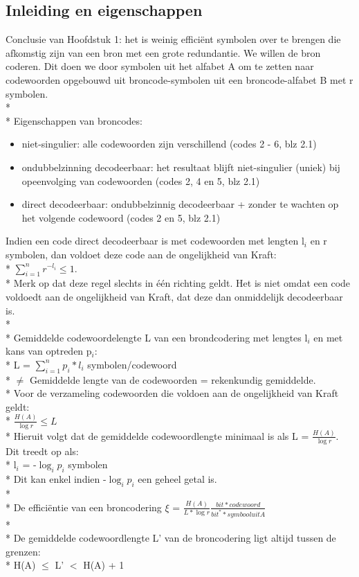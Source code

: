 \documentclass[10pt]{article}
\begin{document}
\subsection{Inleiding en eigenschappen}
Conclusie van Hoofdstuk 1: het is weinig effici\"ent symbolen over te brengen die afkomstig zijn van een bron met een grote redundantie. We willen de bron coderen. Dit doen we door symbolen uit het alfabet A om te zetten naar codewoorden opgebouwd uit broncode-symbolen uit een broncode-alfabet B met r symbolen.\\*\\*
Eigenschappen van broncodes:
\begin{itemize}
\item niet-singulier: alle codewoorden zijn verschillend {\scriptsize (codes 2 - 6, blz 2.1)}
\item ondubbelzinning decodeerbaar: het resultaat blijft niet-singulier (uniek) bij opeenvolging van codewoorden {\scriptsize (codes 2, 4 en 5, blz 2.1)}
\item direct decodeerbaar: ondubbelzinnig decodeerbaar + zonder te wachten op het volgende codewoord {\scriptsize (codes 2 en 5, blz 2.1)}
\end{itemize}
Indien een code direct decodeerbaar is met codewoorden met lengten l$_i$ en r symbolen, dan voldoet deze code aan de ongelijkheid van Kraft:\\*
$\sum_{i = 1}^{n} r^{-l_i} \leq 1$.\\*
Merk op dat deze regel slechts in \'e\'en richting geldt. Het is niet omdat een code voldoedt aan de ongelijkheid van Kraft, dat deze dan onmiddelijk decodeerbaar is.\\*\\*
Gemiddelde codewoordelengte L van een brondcodering met lengtes l$_i$ en met kans van optreden p$_i$:\\*
L = $\sum_{i = 1}^{n} p_i*l_i$ symbolen/codewoord\\*
{\scriptsize $\not=$ Gemiddelde lengte van de codewoorden = rekenkundig gemiddelde.}\\*
Voor de verzameling codewoorden die voldoen aan de ongelijkheid van Kraft geldt:\\*
$\frac{H(A)}{\log r} \leq L$\\*
Hieruit volgt dat de gemiddelde codewoordlengte minimaal is als L = $\frac{H(A)}{\log r}$. Dit treedt op als:\\*
l$_i$ = -$\log_i p_i$ symbolen\\*
Dit kan enkel indien -$\log_i p_i$ een geheel getal is.\\*\\*
De effici\"entie van een broncodering $\xi$ = $\frac{H(A)}{L*\log r} \frac{bit*codewoord}{bit^**symbool uit A}$\\*\\*
De gemiddelde codewoordlengte L' van de broncodering ligt altijd tussen de grenzen:\\*
H(A) $\leq$ L' $<$ H(A) + 1
\end{document}
